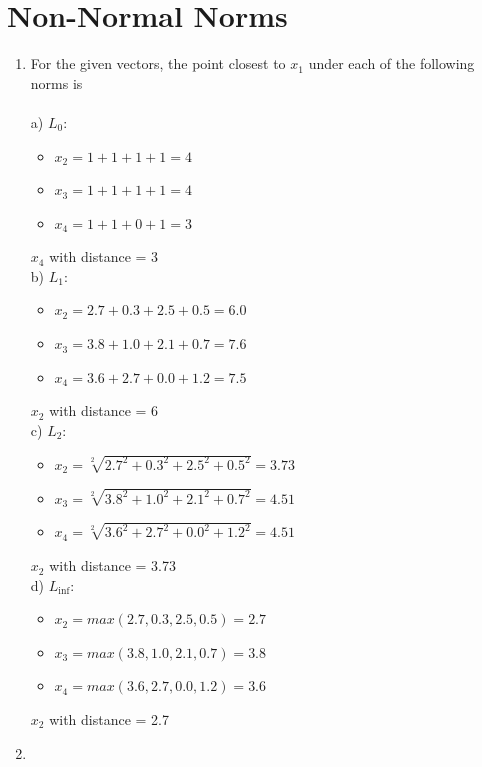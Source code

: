 \section{Non-Normal Norms}

\begin{enumerate}
\item

For the given vectors, the point closest to $x_1$ under each of the following norms is \\\\
a) $L_0$: 
\begin{itemize}
	\item $x_2 = 1 + 1 + 1 + 1 = 4$
	\item $x_3 = 1 + 1 + 1 + 1 = 4$
	\item $x_4 = 1 + 1 + 0 + 1 = 3$
\end{itemize}
$x_4$ with distance = 3 \\

b) $L_1$: 
\begin{itemize}
	\item $x_2 = 2.7 + 0.3 + 2.5 + 0.5 = 6.0$
	\item $x_3 = 3.8 + 1.0 + 2.1 + 0.7 = 7.6$
	\item $x_4 = 3.6 + 2.7 + 0.0 + 1.2 = 7.5$
\end{itemize}
$x_2$ with distance = 6 \\

c) $L_2$: 
\begin{itemize}
	\item $x_2 = \sqrt[2]{2.7^2 + 0.3^2 + 2.5^2 + 0.5^2} = 3.73$
	\item $x_3 = \sqrt[2]{3.8^2 + 1.0^2 + 2.1^2 + 0.7^2} = 4.51$
	\item $x_4 = \sqrt[2]{3.6^2 + 2.7^2 + 0.0^2 + 1.2^2} = 4.51$
\end{itemize}
$x_2$ with distance = 3.73 \\

d) $L_{\inf}$: 
\begin{itemize}
	\item $x_2 = max(2.7, 0.3, 2.5, 0.5) = 2.7$
	\item $x_3 = max(3.8, 1.0, 2.1, 0.7) = 3.8$
	\item $x_4 = max(3.6, 2.7, 0.0, 1.2) = 3.6$
\end{itemize}
$x_2$ with distance = 2.7 \\

\item 


\end{enumerate}

